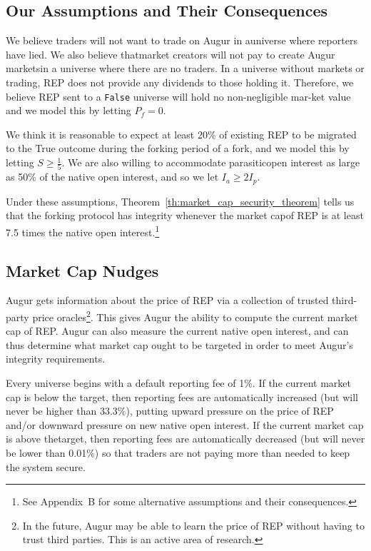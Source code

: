 \documentclass[12pt,floatfix,reprint,nofootinbib,amsmath,amssymb,epsfig,pre,floats,letterpaper,groupedaffiliation]{revtex4-1}
\theoremstyle{definition}
\theoremstyle{definition}
\begin{document}
\subsection{Our Assumptions and Their Consequences}

We believe traders will not want to trade on Augur in a\linebreak universe where reporters have lied. We also believe that\linebreak market creators will not pay to create Augur markets\linebreak in a universe where there are no traders. In a universe without markets or trading, REP does not provide any dividends to those holding it. Therefore, we believe REP sent to a \texttt{False} universe will hold no non-negligible mar-\linebreak ket value and we model this by letting $P_f = 0$.

We think it is reasonable to expect at least 20\% of existing REP to be migrated to the True outcome during the forking period of a fork, and we model this by letting $S \geq \frac{1}{5}$. We are also willing to accommodate parasitic\linebreak open interest as large as 50\% of the native open interest, and so we let $I_a \geq 2I_p$.

Under these assumptions, Theorem~\ref{th:market_cap_security_theorem} tells us that the forking protocol has integrity whenever the market cap\linebreak of REP is at least 7.5 times the native open interest.\footnote{See Appendix~B for some alternative assumptions and their conse\-quences.}

\subsection{Market Cap Nudges}\label{section:market_cap_nudges}

Augur gets information about the price of REP via a collection of trusted third-party price oracles\footnote{In the future, Augur may be able to learn the price of REP without having to trust third parties. This is an active area of research.}. This gives Augur the ability to compute the current market cap of REP. Augur can also measure the current native open interest, and can thus determine what market cap ought to be targeted in order to meet Augur's integrity requirements.

Every universe begins with a default reporting fee of 1\%. If the current market cap is below the target, then reporting fees are automatically increased (but will never be higher than 33.3\%), putting upward pressure on the price of REP and/or downward pressure on new native open interest. If the current market cap is above the\linebreak target, then reporting fees are automatically decreased (but will never be lower than 0.01\%) so that traders are not paying more than needed to keep the system secure.
\end{document}
